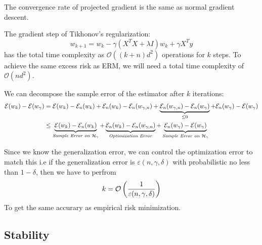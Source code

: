 \begin{theorem}
    The convergence rate of projected gradient is the same as normal gradient descent.
\end{theorem}

\begin{remark}
    The gradient step of Tikhonov's regularization:
    \begin{equation*}
        w_{k+1} = w_k - \gamma(X^TX + \lambda I)w_k + \gamma X^Ty
    \end{equation*}
    has the total time complexity as $\mathcal{O}((k+n)d^2)$ operations for $k$ steps. To achieve the same excess risk as ERM, we will need a total time complexity of $\mathcal{O}(nd^2)$. 
\end{remark}

\begin{proposition}
    We can decompose the sample error of the estimator after $k$ iterations:
    \begin{equation*}
    \begin{aligned}
        \mathcal{E}(w_k) - \mathcal{E}(w_\gamma)  &= \mathcal{E}(w_k) - \mathcal{E}_n(w_k) + \mathcal{E}_n(w_k) - \mathcal{E}_n(w_{\gamma, n}) + \underbrace{\mathcal{E}_n(w_{\gamma, n}) - \mathcal{E}_n(w_\gamma)}_{\le0} +\mathcal{E}_n(w_{\gamma}) - \mathcal{E}(w_\gamma) \\
        &\le \underbrace{\mathcal{E}(w_k) - \mathcal{E}_n(w_k)}_{\text{\emph{Sample Error on }} \mathcal{H}_\gamma } + \underbrace{\mathcal{E}_n(w_k) - \mathcal{E}_n(w_{\gamma, n})}_{\text{\emph{Optimization Error}}} +\underbrace{\mathcal{E}_n(w_{\gamma}) - \mathcal{E}(w_\gamma)}_{\text{\emph{Sample Error on }} \mathcal{H}_\gamma}
    \end{aligned}
    \end{equation*}
\end{proposition}

\begin{remark}
    Since we know the generalization error, we can control the optimization error to match this i.e if the generalization error is $\varepsilon(n,\gamma,\delta)$ with probabilistic no less than $1-\delta$, then we have to perfrom 
    \begin{equation*}
        k = \mathcal{O}\left( \frac{1}{\varepsilon(n,\gamma,\delta)} \right)
    \end{equation*}
    To get the same accurary as empirical risk minimization.
\end{remark}

\subsection{Stability}

